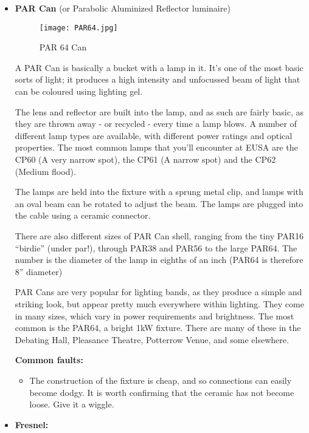 \documentclass[14pt]{article} %
\begin{document}
\begin{itemize}
\item \textbf{PAR Can} (or Parabolic Aluminized Reflector luminaire) 

\begin{figure*}[h]
\begin{center}

\texttt{[image: PAR64.jpg]}
\caption{PAR 64 Can}
\label{fig:par64}

\end{center}
\end{figure*}

A PAR Can is basically a bucket with a lamp in it. 
It’s one of the most basic sorts of light; it produces a high intensity and unfocussed beam of light that can be coloured using lighting gel. 

The lens and reflector are built into the lamp, and as such are fairly basic, as they are thrown away - or recycled - every time a lamp blows.
A number of different lamp types are available, with different power ratings and optical properties. The most common lamps that you’ll encounter at EUSA are the CP60 (A very narrow spot), the CP61 (A narrow spot) and the CP62 (Medium flood).

The lamps are held into the fixture with a sprung metal clip, and lamps with an oval beam can be rotated to adjust the beam. The lamps are plugged into the cable using a ceramic connector.

There are also different sizes of PAR Can shell, ranging from the tiny PAR16 “birdie” (under par!), through PAR38 and PAR56 to the large PAR64. The number is the diameter of the lamp in eighths of an inch (PAR64 is therefore 8” diameter)

PAR Cans are very popular for lighting bands, as they produce a simple and striking look, but appear pretty much everywhere within lighting. They come in many sizes, which vary in power requirements and brightness. The most common is the PAR64, a bright 1kW fixture. There are many of these in the Debating Hall, Pleasance Theatre, Potterrow Venue, and some elsewhere.

\textbf{Common faults:}
\begin{itemize}
\item The construction of the fixture is cheap, and so connections can easily become dodgy. It is worth confirming that the ceramic has not become loose. Give it a wiggle.
\end{itemize}

\item \textbf{Fresnel:} 


\end{itemize}
\end{document}
